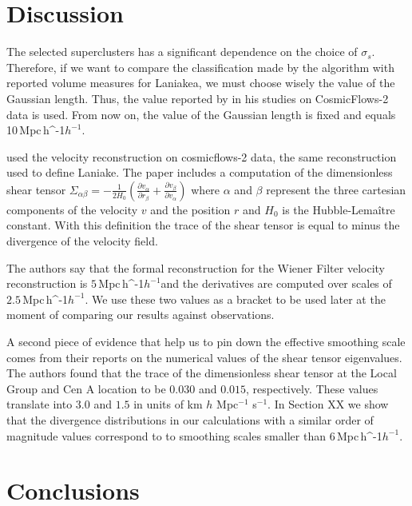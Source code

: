 \documentclass[usenatbib]{mnras}
\newcommand{\Mpch}{\,{\rm Mpc}\,\ifmmode h^{-1}\else $h^{-1}$\fi}
\begin{document}
\section{Discussion}

The selected superclusters has a significant dependence on the choice of $\sigma_s$. Therefore, if we want to compare the classification made by the algorithm with reported volume measures for Laniakea, we must choose wisely the value of the Gaussian length. Thus, the value reported by \cite{2014Natur.513...71T} in his studies on CosmicFlows-2 data is used. From now on, the value of the Gaussian length is fixed and equals 10\Mpch. 



\cite{2015MNRAS.452.1052L} used the velocity reconstruction on cosmicflows-2 data, the same reconstruction used to define Laniake.
The paper includes a computation of the dimensionless shear tensor $\Sigma_{\alpha\beta}=-\frac{1}{2H_0}\left(\frac{\partial v_\alpha}{\partial r_\beta}+\frac{\partial v_\beta}{\partial v_\alpha}\right)$ where $\alpha$ and $\beta$ represent the three cartesian components of the velocity $v$ and the position $r$ and $H_0$ is the Hubble-Lema\^itre constant.
With this definition the trace of the shear tensor is equal to minus the divergence of the velocity field.


The authors say that the formal reconstruction for the Wiener Filter velocity reconstruction is $5$\Mpch and the derivatives are computed over scales of $2.5$\Mpch. 
We use these two values as a bracket to be used later at the moment of comparing our results against observations.

A second piece of evidence that help us to pin down the effective smoothing scale comes from their reports on the numerical values of the shear tensor eigenvalues.
The authors found that the trace of the dimensionless shear tensor at the Local Group and Cen A location to be $0.030$ and $0.015$, respectively. 
These values translate into $3.0$ and $1.5$ in units of km $h$ Mpc$^{-1}$ s$^{-1}$. 
In Section XX we show that the divergence distributions in our calculations with a similar order of magnitude values correspond to 
to smoothing scales smaller than $6$\Mpch.





\section{Conclusions}
\label{sec:conclusions}
\end{document}
